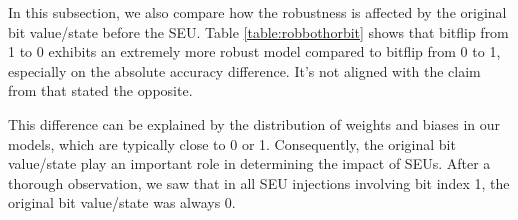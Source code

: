 In this subsection, we also compare how the robustness is affected by the original bit value/state before the SEU. Table \ref{table:robbothorbit} shows that bitflip from 1 to 0 exhibits an extremely more robust model compared to bitflip from 0 to 1, especially on the absolute accuracy difference. It's not aligned with the claim from \cite{Hanif2021} that stated the opposite. 

This difference can be explained by the distribution of weights and biases in our models, which are typically close to 0 or 1. Consequently, the original bit value/state play an important role in determining the impact of SEUs. After a thorough observation, we saw that in all SEU injections involving bit index 1, the original bit value/state was always 0. 

